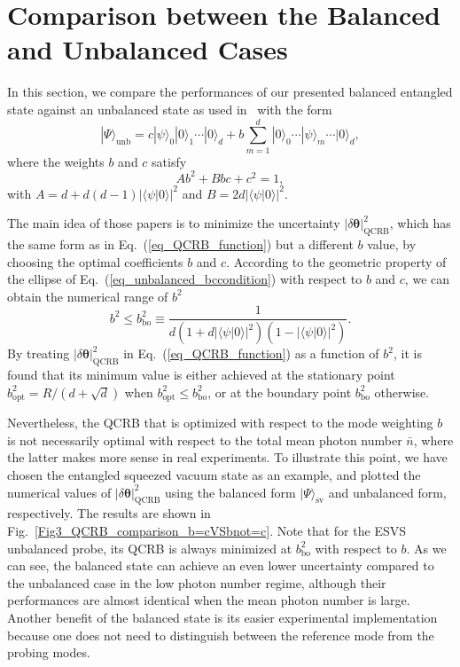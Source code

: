 \documentclass[aps,pra,reprint,showpacs,groupedaddress]{revtex4-1}
\begin{document}
\section{Comparison between the Balanced and Unbalanced Cases}


In this section, we compare the performances of our presented balanced entangled state against an unbalanced state as used in~\cite{Humphreys2013_multi_NOON_l,Liu2016_multi_GeneralizedECS_lnl} with the form
\begin{equation}
    |\Psi\rangle_\text{unb}
    =
    c |\psi\rangle_0 |0\rangle_1  \cdots |0\rangle_d
    +
    b\sum_{m=1}^{d}|0\rangle_0 \cdots |\psi\rangle_m \cdots |0\rangle_d  ,
    \label{eq_unbalanced_state}
\end{equation}
where the weights $b$ and $c$ satisfy
\begin{equation}
    A b^2 + B bc +c^2 =1,
    \label{eq_unbalanced_bccondition}
\end{equation}
with $A=d+d(d-1)|\langle\psi|0\rangle|^2$ and $B=2d|\langle\psi|0\rangle|^2$.

The main idea of those papers is to minimize the uncertainty $|\delta\boldsymbol{\theta}|_{\text{QCRB}}^2$, which has the same form as in Eq.~(\ref{eq_QCRB_function}) but a different $b$ value, by choosing the optimal coefficients $b$ and $c$.  According to the geometric property of the ellipse of Eq.~(\ref{eq_unbalanced_bccondition}) with respect to $b$ and $c$, we can obtain the numerical range of $b^2$
\begin{equation}
    b^2\leq b_\text{bo}^2 \equiv \frac{1}{d\left(1+d|\langle\psi|0\rangle|^2\right)\left(1-|\langle\psi|0\rangle|^2\right)}.
\end{equation}
By treating $|\delta\boldsymbol{\theta}|_{\text{QCRB}}^2$ in Eq.~(\ref{eq_QCRB_function}) as a function of $b^2$, it is found that its minimum value is either achieved at the stationary point $b_\text{opt}^2 = R/(d+\sqrt{d})$ when $b_\text{opt}^2 \leq b_\text{bo}^2 $, or at the boundary point $b_\text{bo}^2$ otherwise.


Nevertheless, the QCRB that is optimized with respect to the mode weighting $b$ is not necessarily optimal with respect to the total mean photon number $\bar{n}$, where the latter makes more sense in real experiments.  To illustrate this point, we have chosen the entangled squeezed vacuum state as an example, and plotted the numerical values of $|\delta\boldsymbol{\theta}|_{\text{QCRB}}^2$ using the balanced form $|\Psi\rangle_\text{sv}$ and unbalanced form, respectively. The results are shown in Fig.~\ref{Fig3_QCRB_comparison_b=cVSbnot=c}. Note that for the ESVS unbalanced probe, its QCRB is always minimized at $b_\text{bo}^2$ with respect to $b$.
As we can see, the balanced state can achieve an even lower uncertainty compared to the unbalanced case in the low photon number regime, although their performances are almost identical when the mean photon number is large. Another benefit of the balanced state is its easier experimental implementation because one does not need to distinguish between the reference mode from the probing modes.
\end{document}
